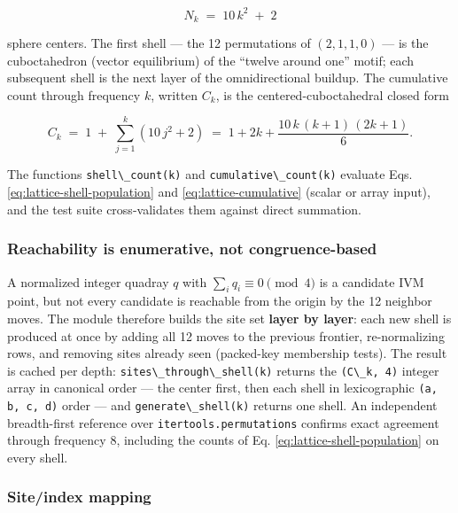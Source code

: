 \documentclass[
  10pt,
]{article}
\newcommand{\passthrough}[1]{#1}
\begin{document}
\begin{equation}\label{eq:lattice-shell-population}
N_k \;=\; 10\,k^{2} \;+\; 2
\end{equation}

sphere centers. The first shell --- the 12 permutations of
\((2, 1, 1, 0)\) --- is the cuboctahedron (vector equilibrium) of the
``twelve around one'' motif; each subsequent shell is the next layer of
the omnidirectional buildup. The cumulative count through frequency
\(k\), written \(C_k\), is the centered-cuboctahedral closed form

\begin{equation}\label{eq:lattice-cumulative}
C_k \;=\; 1 \;+\; \sum_{j=1}^{k} \left(10\,j^{2} + 2\right) \;=\; 1 + 2k + \frac{10\,k\,(k+1)\,(2k+1)}{6}.
\end{equation}

The functions \passthrough{\lstinline!shell\_count(k)!} and
\passthrough{\lstinline!cumulative\_count(k)!} evaluate Eqs.
\eqref{eq:lattice-shell-population} and \eqref{eq:lattice-cumulative}
(scalar or array input), and the test suite cross-validates them against
direct summation.

\subsubsection{Reachability is enumerative, not
congruence-based}\label{reachability-is-enumerative-not-congruence-based}

A normalized integer quadray \(q\) with \(\sum_i q_i \equiv 0 \pmod 4\)
is a candidate IVM point, but not every candidate is reachable from the
origin by the 12 neighbor moves. The module therefore builds the site
set \textbf{layer by layer}: each new shell is produced at once by
adding all 12 moves to the previous frontier, re-normalizing rows, and
removing sites already seen (packed-key membership tests). The result is
cached per depth: \passthrough{\lstinline!sites\_through\_shell(k)!}
returns the \passthrough{\lstinline!(C\_k, 4)!} integer array in
canonical order --- the center first, then each shell in lexicographic
\passthrough{\lstinline!(a, b, c, d)!} order --- and
\passthrough{\lstinline!generate\_shell(k)!} returns one shell. An
independent breadth-first reference over
\passthrough{\lstinline!itertools.permutations!} confirms exact
agreement through frequency 8, including the counts of Eq.
\eqref{eq:lattice-shell-population} on every shell.

\subsubsection{Site/index mapping}\label{siteindex-mapping}
\end{document}
